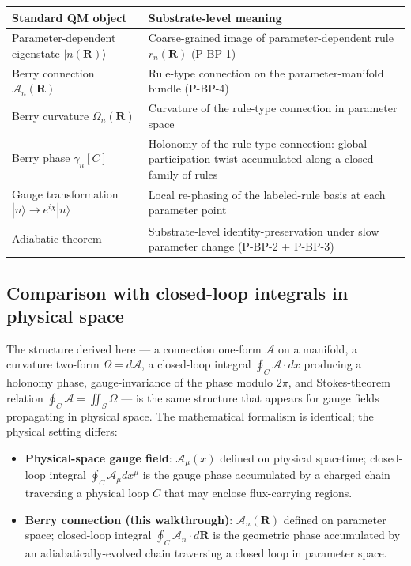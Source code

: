 \documentclass[11pt,a4paper]{article}
\begin{document}
\begin{center}
\small
\begin{tabular}{@{}p{6cm}p{8cm}@{}}
\toprule
Standard QM object & Substrate-level meaning \\
\midrule
Parameter-dependent eigenstate $|n(\mathbf{R})\rangle$ & Coarse-grained image of parameter-dependent rule $r_n(\mathbf{R})$ (P-BP-1) \\
Berry connection $\mathcal{A}_n(\mathbf{R})$ & Rule-type connection on the parameter-manifold bundle (P-BP-4) \\
Berry curvature $\Omega_n(\mathbf{R})$ & Curvature of the rule-type connection in parameter space \\
Berry phase $\gamma_n[C]$ & Holonomy of the rule-type connection: global participation twist accumulated along a closed family of rules \\
Gauge transformation $|n\rangle \to e^{i\chi}|n\rangle$ & Local re-phasing of the labeled-rule basis at each parameter point \\
Adiabatic theorem & Substrate-level identity-preservation under slow parameter change (P-BP-2 + P-BP-3) \\
\bottomrule
\end{tabular}
\end{center}

\subsection{Comparison with closed-loop integrals in physical space}

The structure derived here --- a connection one-form $\mathcal{A}$ on a manifold, a curvature two-form $\Omega = d\mathcal{A}$, a closed-loop integral $\oint_C \mathcal{A}\cdot dx$ producing a holonomy phase, gauge-invariance of the phase modulo $2\pi$, and Stokes-theorem relation $\oint_C \mathcal{A} = \iint_S \Omega$ --- is the same structure that appears for gauge fields propagating in physical space. The mathematical formalism is identical; the physical setting differs:

\begin{itemize}[noitemsep]
  \item \textbf{Physical-space gauge field}: $\mathcal{A}_\mu(x)$ defined on physical spacetime; closed-loop integral $\oint_C \mathcal{A}_\mu dx^\mu$ is the gauge phase accumulated by a charged chain traversing a physical loop $C$ that may enclose flux-carrying regions.
  \item \textbf{Berry connection (this walkthrough)}: $\mathcal{A}_n(\mathbf{R})$ defined on parameter space; closed-loop integral $\oint_C \mathcal{A}_n\cdot d\mathbf{R}$ is the geometric phase accumulated by an adiabatically-evolved chain traversing a closed loop in parameter space.
\end{itemize}
\end{document}
